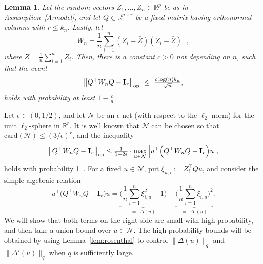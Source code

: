 \documentclass[aos,preprint]{imsart}
\numberwithin{equation}{section}
\theoremstyle{plain}
\newtheorem{lemma}{Lemma}[section]
\newcommand{\R}{\mathbb{R}}
\newcommand{\e}{\epsilon}
\newcommand{\ttop}{^{\top}}
\newcommand{\op}{_{\textup{op}}}
\newcommand{\ts}{\textstyle}
\newcommand{\1}{{\bf{1}}}
\newcommand{\0}{\mathbf{0}}
\begin{document}
\begin{lemma}\label{lem:white}
 Let the random vectors $Z_1,\dots,Z_n\in\R^p$ be as in Assumption~\ref{A:model}, and let $Q\in \R^{p\times r}$ be a fixed matrix having orthonormal columns with $r\leq k_n$. Lastly, let
 \begin{equation}\label{eqn:Wndef}
 W_n=\frac 1n \sum_{i=1}^n  (Z_i-\bar Z)(Z_i-\bar Z)\ttop,
 \end{equation}
 where $\bar Z=\frac 1n \sum_{i=1}^n Z_i$. Then, there is a constant $c>0$ not depending on $n$, such that the event
  \begin{equation}\label{eqn:opnormevent}
 \big\|Q\ttop W_nQ-\mathbf{I}_{r}\big\|\op \ \leq \ \ts\frac{c\log(n)k_n}{\sqrt n},
 \end{equation}
 holds with probability at least $1-\frac cn$. 
\end{lemma}
\proof 
Let $\e\in (0,1/2)$, and let $\mathcal{N}$ be an $\e$-net (with respect to the $\ell_2$-norm) for the unit $\ell_2$-sphere in $\R^{r}$. It is well known that $\mathcal{N}$ can be chosen so that $\text{card}(\mathcal{N})\leq (3/\e)^{r}$, and the inequality
$$\big\|Q\ttop W_n Q- \mathbf{I}_{r}\big\|\op \leq \ts\frac{1}{1-2\e}\cdot \displaystyle \max_{u\in\mathcal{N}} \Big|u\ttop\Big(Q\ttop W_n Q-\mathbf{I}_{r}\Big)u\Big|,$$
holds with probability 1~\citep[Lemmas 5.2 and 5.4]{Vershynin:2012}. For a fixed $u\in\mathcal{N}$, put $\xi_{u,i}:=Z_i\ttop Qu$,
and consider the simple algebraic relation
\begin{equation}
u\ttop\Big(Q\ttop W_n Q-\mathbf{I}_{r}\Big)u = \underbrace{\Big(\ts\frac{1}{n}\sum_{i=1}^n \xi_{i,u}^2-1\Big)}_{=: \Delta(u)}- \underbrace{\Big(\ts\frac{1}{n}\sum_{i=1}^n \xi_{i,u}\Big)^2}_{=:\Delta'(u)}.
\end{equation}
%
We will show that both terms on the right side are small with high probability, and then take a union bound over $u\in\mathcal{N}$. The high-probability bounds will be obtained by using Lemma~\ref{lem:rosenthal} to control $\|\Delta(u)\|_q$ and $\|\Delta'(u)\|_q$ when $q$ is sufficiently large.\\
\end{document}
